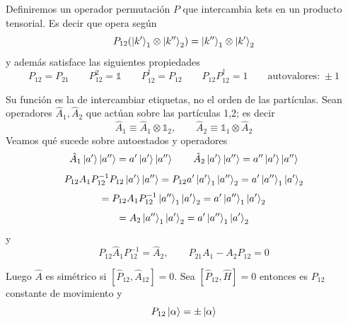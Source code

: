 \documentclass[10pt,oneside]{CBFT_book}
\begin{document}
Definiremos un operador permutación $P$ que intercambia kets en un producto tensorial.
Es decir que opera según 
\[
	P_{12}( \Ket{k'}_1\otimes \Ket{k''}_2 ) = \Ket{k''}_1\otimes \Ket{k'}_2
\]
y además satisface las siguientes propiedades
\[
	P_{12} = P_{21} \qquad P_{12}^2 = \mathbb{1} \qquad P_{12}^\dagger = P_{12} \qquad 
	P_{12}P_{12}^\dagger = 1 \qquad \text{autovalores:} \; \pm 1
\]

Su función es la de intercambiar etiquetas, no el orden de las partículas.
Sean operadores $\hat{A}_1,\hat{A}_2$ que actúan sobre las partículas 1,2; es decir 
\[
	\hat{A}_1 \equiv \hat{A}_1\otimes\mathbb{1}_2, \qquad 
	\hat{A}_2 \equiv \mathbb{1}_1\otimes\hat{A}_2
\]
Veamos qué sucede sobre autoestados y operadores
\[
	\hat{A}_1 \Ket{a'} \Ket{a''} = a' \Ket{a'} \Ket{a''} \qquad 
	\hat{A}_2 \Ket{a'} \Ket{a''} = a'' \Ket{a'} \Ket{a''} 
\]
\[
	P_{12}A_1P_{12}^{-1}P_{12}\Ket{a'} \Ket{a''} = P_{12} a' \Ket{a'}_1 \Ket{a''}_2 =
	a' \Ket{a''}_1 \Ket{a'}_2
\]
\[
	= P_{12}A_1P_{12}^{-1} \Ket{a''}_1 \Ket{a'}_2 = a' \Ket{a''}_1 \Ket{a'}_2
\]
\[
	= A_2 \Ket{a''}_1 \Ket{a'}_2 = a' \Ket{a''}_1 \Ket{a'}_2
\]
y
\[
	P_{12}\hat{A}_1P_{12}^{-1} = \hat{A}_2, \qquad P_{21} A_1 - A_2 P_{12} = 0
\]


Luego $\hat{A}$ es simétrico si $[\hat{P}_{12},\hat{A}_{12}]=0$. Sea $[\hat{P}_{12},\hat{H}]=0$ entonces es 
$P_{12}$ constante de movimiento y 
\[
	P_{12} \Ket{\alpha} = \pm \Ket{\alpha}
\]
\end{document}
